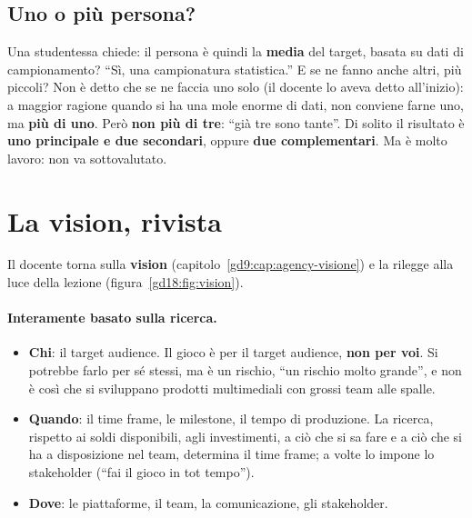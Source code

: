 \subsection{Uno o più persona?}

Una studentessa chiede: il persona è quindi la \textbf{media} del target, basata su
dati di campionamento? ``Sì, una campionatura statistica.'' E se ne fanno anche altri,
più piccoli? Non è detto che se ne faccia uno solo (il docente lo aveva detto
all'inizio): a maggior ragione quando si ha una mole enorme di dati, non conviene
farne uno, ma \textbf{più di uno}. Però \textbf{non più di tre}: ``già tre sono
tante''. Di solito il risultato è \textbf{uno principale e due secondari}, oppure
\textbf{due complementari}. Ma è molto lavoro: non va sottovalutato.

\section{La vision, rivista}
\label{gd18:sec:vision}


Il docente torna sulla \textbf{vision} (capitolo~\ref{gd9:cap:agency-visione}) e la
rilegge alla luce della lezione (figura~\ref{gd18:fig:vision}).

\paragraph{Interamente basato sulla ricerca.}
\begin{itemize}
  \item \textbf{Chi}: il target audience. Il gioco è per il target audience,
        \textbf{non per voi}. Si potrebbe farlo per sé stessi, ma è un rischio, ``un
        rischio molto grande'', e non è così che si sviluppano prodotti multimediali
        con grossi team alle spalle.
  \item \textbf{Quando}: il time frame, le milestone, il tempo di produzione. La
        ricerca, rispetto ai soldi disponibili, agli investimenti, a ciò che si sa
        fare e a ciò che si ha a disposizione nel team, determina il time frame; a
        volte lo impone lo stakeholder (``fai il gioco in tot tempo'').
  \item \textbf{Dove}: le piattaforme, il team, la comunicazione, gli stakeholder.
\end{itemize}

